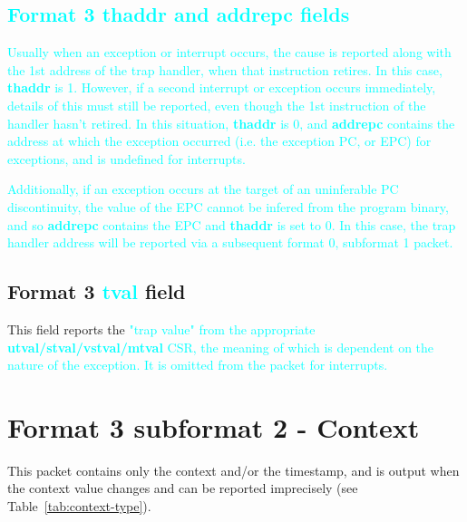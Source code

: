 \subsection{\textcolor{cyan}{Format 3 \textbf{thaddr} and \textbf{addrepc} fields}} \label{sec:addrepc}

\textcolor{cyan}{Usually when an exception or interrupt occurs, the cause is reported along 
with the 1st address of the trap handler, when that instruction retires.  In this case, 
\textbf{thaddr} is 1.  However, if a second interrupt or exception occurs immediately, details of 
this must still be reported, even though the 1st instruction of the handler hasn't retired.  In this 
situation,  \textbf{thaddr} is 0, and \textbf{addrepc} contains the address at which the exception 
occurred (i.e. the exception PC, or EPC) for exceptions, and is undefined for interrupts.}

\textcolor{cyan}{Additionally, if an exception occurs at the target of an uninferable PC discontinuity, the value of 
the EPC cannot be infered from the program binary, and so \textbf{addrepc} contains the EPC and 
\textbf{thaddr} is set to 0.  In this case, the trap handler address will be reported
via a subsequent format 0, subformat 1 packet.}

\subsection{Format 3 \textbf{\textcolor{cyan}{tval}} field}

This field reports the \textcolor{cyan}{"trap value" from the appropriate \textbf{utval/stval/vstval/mtval}
CSR, the meaning of which is dependent on the nature of the exception.  It is omitted
from the packet for interrupts.}

\FloatBarrier
\section{Format 3 subformat 2 - Context} \label{sec:format32}

This packet contains only the context and/or the timestamp, and is output when the context value 
changes and can be reported imprecisely (see Table~\ref{tab:context-type}).

